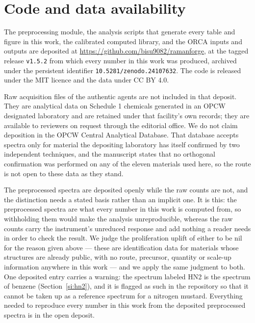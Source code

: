 \documentclass[11pt]{article}
\begin{document}
\section{Code and data availability}

The preprocessing module, the analysis scripts that generate every table and figure in
this work, the calibrated computed library, and the ORCA inputs and outputs are deposited
at \url{https://github.com/bisu9082/ramanforge}, at the tagged release
\texttt{v1.5.2} from which every number in this work was produced, archived under the
persistent identifier \texttt{10.5281/zenodo.24107632}. The code is released
under the MIT licence and the data under CC BY 4.0.

Raw acquisition files of the authentic agents are not included in that deposit. They are
analytical data on Schedule 1 chemicals generated in an OPCW designated laboratory and are
retained under that facility's own records; they are available to reviewers on request
through the editorial office. We do not claim deposition in the OPCW Central Analytical
Database. That database accepts spectra only for material the depositing laboratory has
itself confirmed by two independent techniques, and the manuscript states that
no orthogonal confirmation was performed on any of the eleven materials used here, so the
route is not open to these data as they stand.

The preprocessed spectra are deposited openly while the raw counts are not, and the
distinction needs a stated basis rather than an implicit one. It is this: the preprocessed
spectra are what every number in this work is computed from, so withholding them would make
the analysis unreproducible, whereas the raw counts carry the instrument's unreduced
response and add nothing a reader needs in order to check the result. We judge the
proliferation uplift of either to be nil for the reason given above --- these are
identification data for materials whose structures are already public, with no route,
precursor, quantity or scale-up information anywhere in this work --- and we apply the same
judgment to both. One deposited entry carries a warning: the spectrum labeled HN2 is the
spectrum of benzene (Section~\ref{si:hn2}), and it is flagged as such in the repository so
that it cannot be taken up as a reference spectrum for a nitrogen mustard. Everything
needed to reproduce every number in this work from the deposited preprocessed spectra is in
the open deposit.
\end{document}
